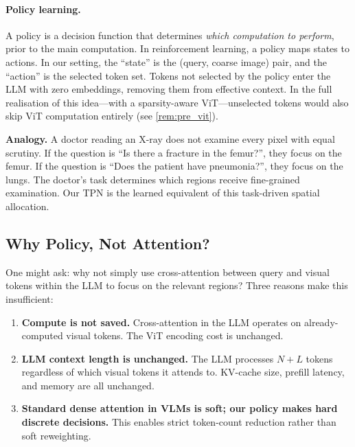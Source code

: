 \documentclass[12pt,a4paper]{article}
\begin{document}
\paragraph{Policy learning.}
A policy is a decision function that determines \emph{which computation to
perform}, prior to the main computation. In reinforcement learning, a policy maps
states to actions. In our setting, the ``state'' is the (query, coarse image)
pair, and the ``action'' is the selected token set. Tokens not selected by the
policy enter the LLM with zero embeddings, removing them from effective context.
In the full realisation of this idea---with a sparsity-aware ViT---unselected
tokens would also skip ViT computation entirely (see \cref{rem:pre_vit}).

\begin{intuitionbox}
  \textbf{Analogy.} A doctor reading an X-ray does not examine every pixel with
  equal scrutiny. If the question is ``Is there a fracture in the femur?'', they
  focus on the femur. If the question is ``Does the patient have pneumonia?'',
  they focus on the lungs. The doctor's task determines which regions receive
  fine-grained examination. Our TPN is the learned equivalent of this
  task-driven spatial allocation.
\end{intuitionbox}

\subsection{Why Policy, Not Attention?}

One might ask: why not simply use cross-attention between query and visual tokens
within the LLM to focus on the relevant regions? Three reasons make this
insufficient:

\begin{enumerate}[leftmargin=2em]
  \item \textbf{Compute is not saved.} Cross-attention in the LLM operates on
    already-computed visual tokens. The ViT encoding cost is unchanged.
  \item \textbf{LLM context length is unchanged.} The LLM processes $N + L$
    tokens regardless of which visual tokens it attends to. KV-cache size,
    prefill latency, and memory are all unchanged.
  \item \textbf{Standard dense attention in VLMs is soft; our policy makes
    hard discrete decisions.} This enables strict token-count reduction rather
    than soft reweighting.
\end{enumerate}
\end{document}
